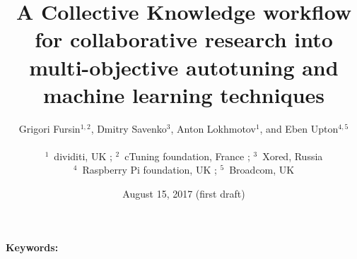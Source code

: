 \documentclass[10pt,letterpaper,twocolumn]{article}
\begin{document}
\date{August 15, 2017 (first draft)}







\title{A Collective Knowledge workflow for collaborative research into\\multi-objective autotuning and machine learning techniques}



\author{Grigori Fursin$^{1,2}$, Dmitry Savenko$^3$, Anton Lokhmotov$^1$, and Eben Upton$^{4,5}$ \\
\\
$^1$~dividiti, UK ; $^2$~cTuning foundation, France ; $^3$~Xored, Russia \\
$^4$~Raspberry Pi foundation, UK ; $^5$~Broadcom, UK\\
}

\maketitle

\begin{abstract}
 
\end{abstract}

{\bf Keywords:}
{\it\small 
 
}
\end{document}
